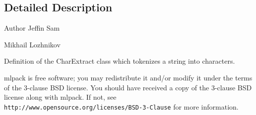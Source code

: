 \subsection{Detailed Description}
\begin{DoxyAuthor}{Author}
Jeffin Sam 

Mikhail Lozhnikov
\end{DoxyAuthor}
Definition of the Char\+Extract class which tokenizes a string into characters.

mlpack is free software; you may redistribute it and/or modify it under the terms of the 3-\/clause B\+SD license. You should have received a copy of the 3-\/clause B\+SD license along with mlpack. If not, see {\tt http\+://www.\+opensource.\+org/licenses/\+B\+S\+D-\/3-\/\+Clause} for more information. 